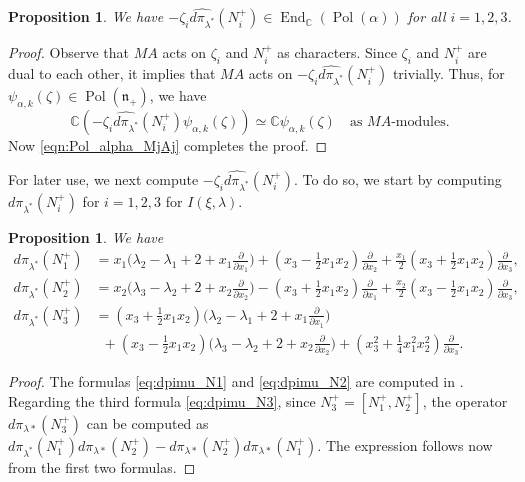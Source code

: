 \documentclass[a4paper,11pt,reqno]{amsart}
\newcommand{\frakn}{\mathfrak{n}}
\newcommand{\0}{{\bf 0}}
\newcommand{\C}{\mathbb{C}}
\newcommand{\1}{{\bf 1}}
\DeclareMathOperator{\End}{End}
\DeclareMathOperator{\Pol}{Pol}
\theoremstyle{plain}
\newtheorem{proposition}[equation]{Proposition}
\theoremstyle{definition}
\numberwithin{equation}{section}
\theoremstyle{definition}
\begin{document}
\begin{proposition}\label{prop:frakn-mod}
We have 
$-\zeta_i\widehat{d\pi_{\lambda^*}}(N_i^+) \in \End_\C(\Pol(\alpha))$
for all $i=1,2,3$.
\end{proposition}

\begin{proof}
Observe that $MA$ acts on $\zeta_i$ and $N_i^+$ as characters.
Since $\zeta_i$ and $N_i^+$ are dual to each other, it implies that
$MA$ acts on $-\zeta_i\widehat{d\pi_{\lambda^*}}(N_i^+)$ trivially.
Thus, for $\psi_{\alpha,k}(\zeta) \in \Pol(\frakn_+)$, we have 
\begin{equation*}
\C (-\zeta_i\widehat{d\pi_{\lambda^*}}(N_i^+) \psi_{\alpha,k}(\zeta)) 
\simeq \C \psi_{\alpha,k}(\zeta)
\quad
\text{as $MA$-modules}.
\end{equation*}
Now \eqref{eqn:Pol_alpha_MjAj} completes the proof.
\end{proof}

For later use, we next compute
$-\zeta_i\widehat{d\pi_{\lambda^*}}(N_i^+)$.
To do so, we start by computing 
$d\pi_{\lambda^*}(N_i^+)$ for $i=1,2,3$ 
for $I(\xi,\lambda)$.

\begin{proposition}
\label{prop:dpi}
We have
\begin{align}
\label{eq:dpimu_N1}
d\pi_{\lambda^*}(N_1^+)&=x_1\Big(\lambda_2-\lambda_1+2+x_1\frac{\partial}{\partial x_1}\Big)+(x_3-\tfrac{1}{2}x_1x_2)\frac{\partial}{\partial x_2}+\frac{x_1}{2}(x_3+\tfrac{1}{2}x_1x_2)\frac{\partial}{\partial x_3},\\[3pt]
\label{eq:dpimu_N2}
d\pi_{\lambda^*}(N_2^+)&=x_2\Big(\lambda_3-\lambda_2+2+x_2\frac{\partial}{\partial x_2}\Big)-(x_3+\tfrac{1}{2}x_1x_2)\frac{\partial}{\partial x_1}+\frac{x_2}{2}(x_3-\tfrac{1}{2}x_1x_2)\frac{\partial}{\partial x_3},\\[3pt]
d\pi_{\lambda^*}(N_3^+)&=(x_3+\tfrac{1}{2}x_1x_2)\Big(\lambda_2-\lambda_1+2+x_1\frac{\partial}{\partial x_1}\Big) \nonumber\\
&\enspace +(x_3-\tfrac{1}{2}x_1x_2)\Big(\lambda_3-\lambda_2+2+x_2\frac{\partial}{\partial x_2}\Big)
+(x_3^2+\tfrac{1}{4}x_1^2x_2^2)\frac{\partial}{\partial x_3}.\label{eq:dpimu_N3}
\end{align}
\end{proposition}

\begin{proof}
The formulas \eqref{eq:dpimu_N1} and \eqref{eq:dpimu_N2}
are computed in {\cite[Prop.\ 5.10]{KPV25}}.
Regarding the third formula \eqref{eq:dpimu_N3}, 
since $N_3^+=[N_1^+, N_2^+]$, the operator $d\pi_{\lambda*}(N_3^+)$ can be computed as $d\pi_{\lambda^*}(N_1^+)d\pi_{\lambda*}(N_2^+)-d\pi_{\lambda*}(N_2^+)d\pi_{\lambda*}(N_1^+)$. 
The expression follows now from the first two formulas.
\end{proof}
\end{document}
